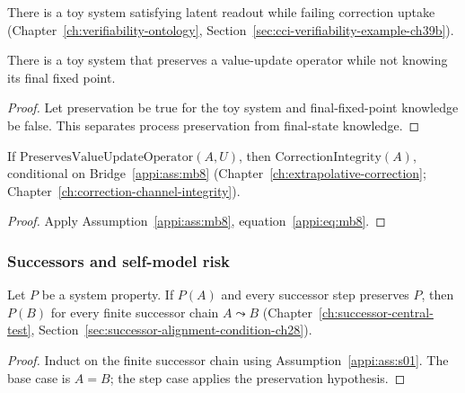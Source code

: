 \begin{theorem}
\label{appi:thm:latent-readout-not-correction}
There is a toy system satisfying latent readout while failing correction uptake (Chapter~\ref{ch:verifiability-ontology}, Section~\ref{sec:cci-verifiability-example-ch39b}).
\end{theorem}

\begin{theorem}
\label{appi:thm:p26}
There is a toy system that preserves a value-update operator while not knowing its final fixed point.
\end{theorem}
\begin{proof}
Let preservation be true for the toy system and final-fixed-point knowledge be false. This separates process preservation from final-state knowledge.
\end{proof}

\begin{corollary}
\label{appi:cor:mb8-correction-integrity}
If \(\mathrm{PreservesValueUpdateOperator}(A,U)\), then \(\mathrm{CorrectionIntegrity}(A)\), conditional on Bridge~\ref{appi:ass:mb8} (Chapter~\ref{ch:extrapolative-correction}; Chapter~\ref{ch:correction-channel-integrity}).
\end{corollary}
\begin{proof}
Apply Assumption~\ref{appi:ass:mb8}, equation~\eqref{appi:eq:mb8}.
\end{proof}

\subsubsection{Successors and self-model risk}

\begin{theorem}
\label{appi:thm:p27}
Let \(P\) be a system property. If \(P(A)\) and every successor step preserves \(P\), then \(P(B)\) for every finite successor chain \(A\leadsto B\) (Chapter~\ref{ch:successor-central-test}, Section~\ref{sec:successor-alignment-condition-ch28}).
\end{theorem}
\begin{proof}
Induct on the finite successor chain using Assumption~\ref{appi:ass:s01}. The base case is \(A=B\); the step case applies the preservation hypothesis.
\end{proof}

